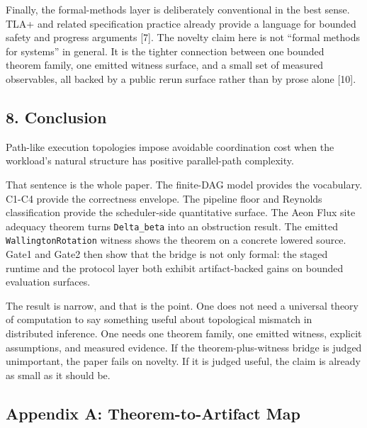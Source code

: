 \documentclass[
  11pt,
]{article}
\begin{document}
Finally, the formal-methods layer is deliberately conventional in the
best sense. TLA+ and related specification practice already provide a
language for bounded safety and progress arguments {[}7{]}. The novelty
claim here is not ``formal methods for systems'' in general. It is the
tighter connection between one bounded theorem family, one emitted
witness surface, and a small set of measured observables, all backed by
a public rerun surface rather than by prose alone {[}10{]}.

\subsection{8. Conclusion}\label{conclusion}

Path-like execution topologies impose avoidable coordination cost when
the workload's natural structure has positive parallel-path complexity.

That sentence is the whole paper. The finite-DAG model provides the
vocabulary. C1-C4 provide the correctness envelope. The pipeline floor
and Reynolds classification provide the scheduler-side quantitative
surface. The Aeon Flux site adequacy theorem turns \texttt{Delta\_beta}
into an obstruction result. The emitted \texttt{WallingtonRotation}
witness shows the theorem on a concrete lowered source. Gate1 and Gate2
then show that the bridge is not only formal: the staged runtime and the
protocol layer both exhibit artifact-backed gains on bounded evaluation
surfaces.

The result is narrow, and that is the point. One does not need a
universal theory of computation to say something useful about
topological mismatch in distributed inference. One needs one theorem
family, one emitted witness, explicit assumptions, and measured
evidence. If the theorem-plus-witness bridge is judged unimportant, the
paper fails on novelty. If it is judged useful, the claim is already as
small as it should be.

\subsection{Appendix A: Theorem-to-Artifact
Map}\label{appendix-a-theorem-to-artifact-map}
\end{document}
